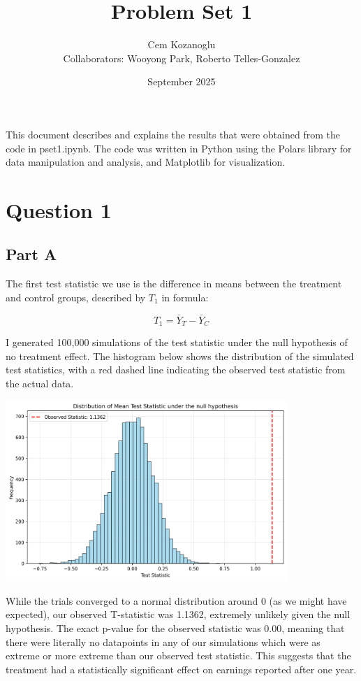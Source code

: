 \documentclass[12pt]{article}
\title{\vspace{-4em}Problem Set 1}
\author{Cem Kozanoglu \\ Collaborators: Wooyong Park, Roberto Telles-Gonzalez}
\date{September 2025}
\begin{document}
\maketitle

This document describes and explains the results that were obtained from the code in pset1.ipynb. The code was written in Python using the Polars library for data manipulation and analysis, and Matplotlib for visualization.

\section{Question 1}

\subsection{Part A}

The first test statistic we use is the difference in means between the treatment and control groups, described by $T_1$ in formula:

\[T_1 = \bar{Y}_T - \bar{Y}_C\]

I generated 100,000 simulations of the test statistic under the null hypothesis of no treatment effect. The histogram below shows the distribution of the simulated test statistics, with a red dashed line indicating the observed test statistic from the actual data.

\vspace*{2em}
\includegraphics[width=0.8\textwidth]{stat1_graph.png}
\vspace*{2em}

While the trials converged to a normal distribution around 0 (as we might have expected), our observed T-statistic was 1.1362, extremely unlikely given the null hypothesis. The exact p-value for the observed statistic was 0.00, meaning that there were literally no datapoints in any of our simulations which were as extreme or more extreme than our observed test statistic. This suggests that the treatment had a statistically significant effect on earnings reported after one year.
\end{document}

